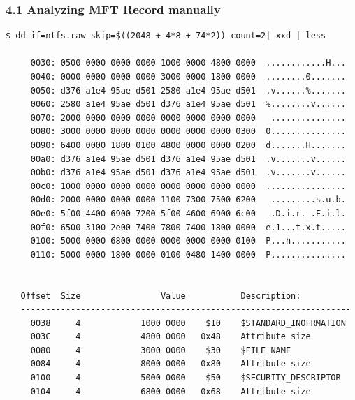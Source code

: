 \begin{frame}[fragile]
  \frametitle{4.1 Analyzing MFT Record manually}
  \begin{lstlisting}[basicstyle=\tiny]
$ dd if=ntfs.raw skip=$((2048 + 4*8 + 74*2)) count=2| xxd | less

     0030: 0500 0000 0000 0000 1000 0000 4800 0000  ............H...
     0040: 0000 0000 0000 0000 3000 0000 1800 0000  ........0.......
     0050: d376 a1e4 95ae d501 2580 a1e4 95ae d501  .v......%.......
     0060: 2580 a1e4 95ae d501 d376 a1e4 95ae d501  %........v......
     0070: 2000 0000 0000 0000 0000 0000 0000 0000   ...............
     0080: 3000 0000 8000 0000 0000 0000 0000 0300  0...............
     0090: 6400 0000 1800 0100 4800 0000 0000 0200  d.......H.......
     00a0: d376 a1e4 95ae d501 d376 a1e4 95ae d501  .v.......v......
     00b0: d376 a1e4 95ae d501 d376 a1e4 95ae d501  .v.......v......
     00c0: 1000 0000 0000 0000 0000 0000 0000 0000  ................
     00d0: 2000 0000 0000 0000 1100 7300 7500 6200   .........s.u.b.
     00e0: 5f00 4400 6900 7200 5f00 4600 6900 6c00  _.D.i.r._.F.i.l.
     00f0: 6500 3100 2e00 7400 7800 7400 1800 0000  e.1...t.x.t.....
     0100: 5000 0000 6800 0000 0000 0000 0000 0100  P...h...........
     0110: 5000 0000 1800 0000 0100 0480 1400 0000  P...............


   Offset  Size                Value           Description:
   ------------------------------------------------------------------
     0038     4            1000 0000    $10    $STANDARD_INOFRMATION
     003C     4            4800 0000   0x48    Attribute size
     0080     4            3000 0000    $30    $FILE_NAME
     0084     4            8000 0000   0x80    Attribute size
     0100     4            5000 0000    $50    $SECURITY_DESCRIPTOR
     0104     4            6800 0000   0x68    Attribute size
  \end{lstlisting}
\end{frame}


